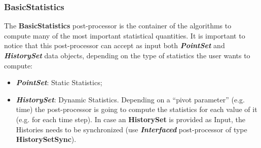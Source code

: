 \subsubsection{BasicStatistics}
\label{BasicStatistics}
The \textbf{BasicStatistics} post-processor is the container of the algorithms
to compute many of the most important statistical quantities. It is important to notice that this
post-processor can accept as input both \textit{\textbf{PointSet}} and \textit{\textbf{HistorySet}}
data objects, depending on the type of statistics the user wants to compute:
\begin{itemize}
  \item \textit{\textbf{PointSet}}: Static Statistics;
  \item \textit{\textbf{HistorySet}}: Dynamic Statistics. Depending on a ``pivot parameter'' (e.g. time)
  the post-processor is going to compute the statistics for each value of it (e.g. for each time step).
  In case an \textbf{HistorySet} is provided as Input, the Histories needs to be synchronized (use
    \textit{\textbf{Interfaced}} post-processor of type  \textbf{HistorySetSync}).
\end{itemize}
%
